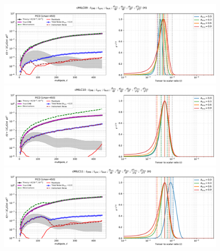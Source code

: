 \documentclass[11pt]{article}
\begin{document}
\begin{figure}
\centering
\includegraphics[width=1.2\textwidth]{ps_and_bbposterir_cMILC09.pdf}
\includegraphics[width=1.2\textwidth]{ps_and_bbposterir_cMILC10.pdf}
\includegraphics[width=1.2\textwidth]{ps_and_bbposterir_cMILC11.pdf}
\end{figure}
\end{document}
